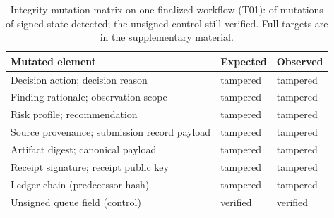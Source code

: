 \begin{table}[!htbp]
\caption{Integrity mutation matrix on one finalized workflow (T01): 
of  mutations of signed state detected; the unsigned control still
verified. Full targets are in the supplementary material.}
\label{tab:trust}
\centering
\small
\setlength{\tabcolsep}{4pt}
\begin{tabular}{@{}L{7.4cm}ll@{}}
\toprule
Mutated element & Expected & Observed \\
\midrule
Decision action; decision reason & tampered & tampered \\
Finding rationale; observation scope & tampered & tampered \\
Risk profile; recommendation & tampered & tampered \\
Source provenance; submission record payload & tampered & tampered \\
Artifact digest; canonical payload & tampered & tampered \\
Receipt signature; receipt public key & tampered & tampered \\
Ledger chain (predecessor hash) & tampered & tampered \\
Unsigned queue field (control) & verified & verified \\
\bottomrule
\end{tabular}
\end{table}
